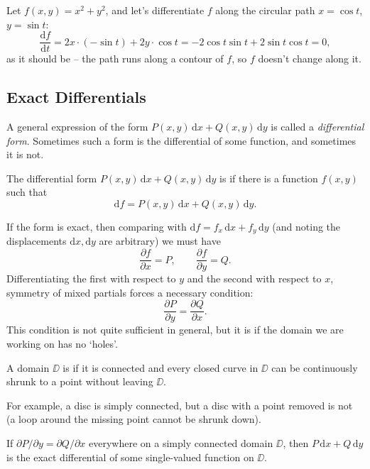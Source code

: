 \documentclass[a4paper]{scrartcl}
\begin{document}
\begin{example}
	Let $f(x, y) = x^2 + y^2$, and let's differentiate $f$ along the circular path $x = \cos t$, $y = \sin t$:
	$$
	\frac{\mathrm{d}f}{\mathrm{d}t} = 2x \cdot (-\sin t) + 2y \cdot \cos t = -2\cos t \sin t + 2 \sin t \cos t = 0,
	$$
	as it should be -- the path runs along a contour of $f$, so $f$ doesn't change along it.
\end{example}

\subsection{Exact Differentials}

A general expression of the form $P(x, y)\, \mathrm{d}x + Q(x, y) \, \mathrm{d}y$ is called a \emph{differential form}. Sometimes such a form is the differential of some function, and sometimes it is not.

\begin{definition}
	The differential form $P(x, y)\,\mathrm{d}x + Q(x, y)\,\mathrm{d}y$ is  if there is a function $f(x, y)$ such that
	$$
	\mathrm{d}f = P(x, y)\,\mathrm{d}x + Q(x, y)\,\mathrm{d}y.
	$$
\end{definition}

If the form is exact, then comparing with $\mathrm{d}f = f_x \, \mathrm{d}x + f_y \, \mathrm{d}y$ (and noting the displacements $\mathrm{d}x, \mathrm{d}y$ are arbitrary) we must have
$$
\frac{\partial f}{\partial x} = P, \qquad \frac{\partial f}{\partial y} = Q.
$$
Differentiating the first with respect to $y$ and the second with respect to $x$, symmetry of mixed partials forces a necessary condition:
$$
\frac{\partial P}{\partial y} = \frac{\partial Q}{\partial x}.
$$
This condition is not quite sufficient in general, but it is if the domain we are working on has no `holes'.

\begin{definition}
	A domain $\DD$ is  if it is connected and every closed curve in $\DD$ can be continuously shrunk to a point without leaving $\DD$.
\end{definition}

For example, a disc is simply connected, but a disc with a point removed is not (a loop around the missing point cannot be shrunk down).

\begin{theorem}
	If $\partial P/\partial y = \partial Q/\partial x$ everywhere on a simply connected domain $\DD$, then $P \, \mathrm{d}x + Q \, \mathrm{d}y$ is the exact differential of some single-valued function on $\DD$.
\end{theorem}
\end{document}
